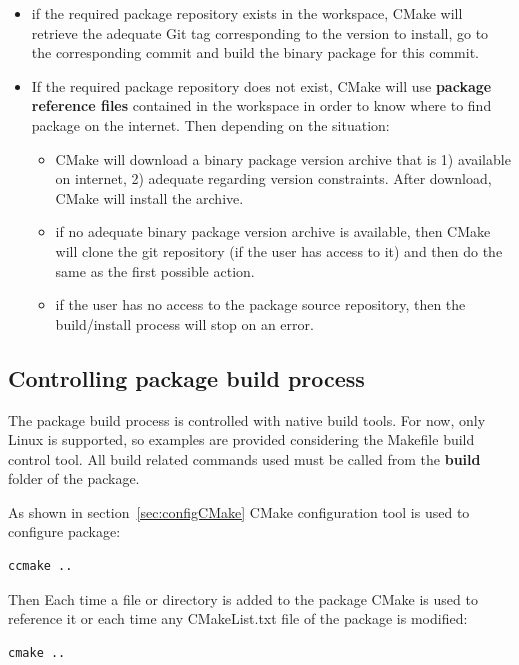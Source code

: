 \documentclass[12pt,a4paper]{article}
\begin{document}
\begin{itemize}
\begin{itemize}
\item if the required package repository exists in the workspace, CMake will retrieve the adequate Git tag corresponding to the version to install, go to the corresponding commit and build the binary package for this commit.
\item If the required package repository does not exist, CMake will use \textbf{package reference files} contained in the workspace in order to know where to find package on the internet. Then depending on the situation:
\begin{itemize}
\item CMake will download a binary package version archive that is 1) available on internet, 2) adequate regarding version constraints. After download, CMake will install the archive.
\item if no adequate binary package version archive is available, then CMake will clone the git repository (if the user has access to it) and then do the same as the first possible action.
\item if the user has no access to the package source repository, then the build/install process will stop on an error.
\end{itemize}
\end{itemize}
\end{itemize}


\subsection{Controlling package build process}
\label{sec:buildCMake}

The package build process is controlled with native build tools. For now, only Linux is supported, so examples are provided considering the Makefile build control tool. All build related commands used must be called from the \textbf{build} folder of the package.

As shown in section~\ref{sec:configCMake} CMake configuration tool is used to configure package: 
\begin{verbatim}
ccmake ..
\end{verbatim}

Then Each time a file or directory is added to the package CMake is used to reference it or each time any CMakeList.txt file of the package is modified:
\begin{verbatim}
cmake ..
\end{verbatim}
\end{document}
